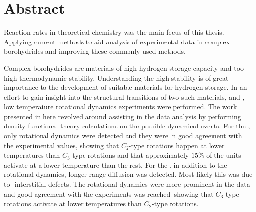 \chapter*{Abstract}

Reaction rates in theoretical chemistry was the main focus of this thesis.
Applying current methods to aid analysis of experimental data in complex borohydrides and improving these commonly used methods.

Complex borohydrides are materials of high hydrogen storage capacity and too high thermodynamic stability.
Understanding the high stability is of great importance to the development of suitable materials for hydrogen storage.
In an effort to gain insight into the structural transitions of two such materials,  and , low temperature rotational dynamics experiments were performed.
The work presented in here revolved around assisting in the data analysis by performing density functional theory calculations on the possible dynamical events.
For the , only rotational dynamics were detected and they were in good agreement with the experimental values, showing that $C_2$-type rotations happen at lower temperatures than $C_3$-type rotations and that approximately $15\%$ of the  units activate at a lower temperature than the rest.
For the , in addition to the rotational dynamics, longer range diffusion was detected.
Most likely this was due to -interstitial defects.
The rotational dynamics were more prominent in the data and good agreement with the experiments was reached, showing that $C_3$-type rotations activate at lower temperatures than $C_2$-type rotations.




\placeholder
